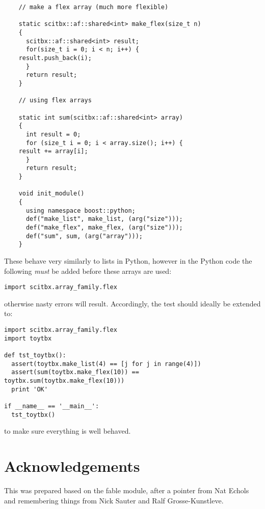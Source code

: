 \documentclass[a4paper, 11pt]{article}
\begin{document}
{\small
\begin{verbatim}
    // make a flex array (much more flexible)

    static scitbx::af::shared<int> make_flex(size_t n)
    {
      scitbx::af::shared<int> result;
      for(size_t i = 0; i < n; i++) {
	result.push_back(i);
      }
      return result;
    }

    // using flex arrays

    static int sum(scitbx::af::shared<int> array)
    {
      int result = 0;
      for (size_t i = 0; i < array.size(); i++) {
	result += array[i];
      }
      return result;
    }

    void init_module()
    {
      using namespace boost::python;
      def("make_list", make_list, (arg("size")));
      def("make_flex", make_flex, (arg("size")));
      def("sum", sum, (arg("array")));
    }
\end{verbatim}
}

These behave very similarly to lists in Python, however in the Python
code the following \emph{must} be added before these arrays are used:

{\small
\begin{verbatim}
import scitbx.array_family.flex
\end{verbatim}
}

\noindent
otherwise nasty errors will result. Accordingly, the test should
ideally be extended to:

{\small
\begin{verbatim}
import scitbx.array_family.flex
import toytbx

def tst_toytbx():
  assert(toytbx.make_list(4) == [j for j in range(4)])
  assert(sum(toytbx.make_flex(10)) == toytbx.sum(toytbx.make_flex(10)))
  print 'OK'

if __name__ == '__main__':
  tst_toytbx()
\end{verbatim}
} 

\noindent
to make sure everything is well behaved.

\section{Acknowledgements}

This was prepared based on the fable module, after a pointer from Nat Echols and remembering things from Nick Sauter and Ralf Grosse-Kunstleve.
\end{document}
